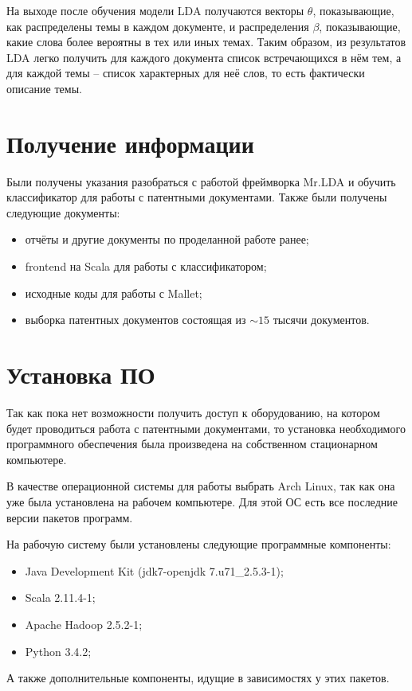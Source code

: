 На выходе после обучения модели LDA получаются векторы \( \theta \), показывающие, как распределены темы в 
каждом документе, и распределения \( \beta \), показывающие, какие слова более вероятны в тех или иных 
темах. Таким образом, из результатов LDA легко получить для каждого документа список встречающихся в нём 
тем, а для каждой темы -- список характерных для неё слов, то есть фактически описание темы.\cite{lda}

\chapter{Получение информации}
Были получены указания разобраться с работой фреймворка Mr.LDA и обучить классификатор для работы 
с патентными документами. Также были получены следующие документы:
\begin{itemize}
    \item отчёты и другие документы по проделанной работе ранее;
    \item frontend на Scala для работы с классификатором;
    \item исходные коды для работы с Mallet;
    \item выборка патентных документов состоящая из \(\sim 15\) тысячи документов.
\end{itemize}

\chapter{Установка ПО}
Так как пока нет возможности получить доступ к оборудованию, на котором будет проводиться работа с 
патентными документами, то установка необходимого программного обеспечения была произведена на 
собственном стационарном компьютере.

В качестве операционной системы для работы выбрать Arch Linux\cite{arch}, так как она уже была 
установлена на рабочем компьютере. Для этой ОС есть все последние версии пакетов программ.

На рабочую систему были установлены следующие программные компоненты:
\begin{itemize}
    \item Java Development Kit (jdk7-openjdk 7.u71\_2.5.3-1);
    \item Scala 2.11.4-1;
    \item Apache Hadoop 2.5.2-1;
    \item Python 3.4.2;
\end{itemize}
А также дополнительные компоненты, идущие в зависимостях у этих пакетов.

